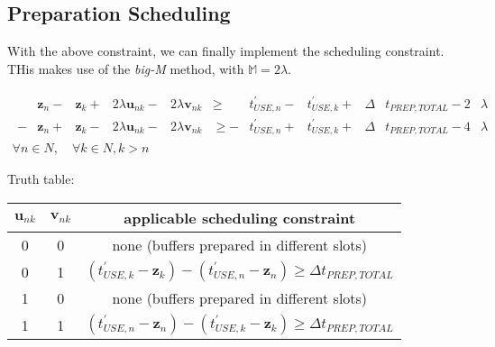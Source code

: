 \subsection{Preparation Scheduling}\label{SS.constr9}

With the above constraint, we can finally implement the scheduling constraint.
THis makes use of the \emph{big-M} method, with $\mathbb{M} = 2 \lambda$.

\begin{equation}
    \begin{split}
        \begin{alignedat}{10}
        &\boldsymbol{z}_{n} {}-{} &\boldsymbol{z}_{k} {}+{} &2 \lambda
        \boldsymbol{u}_{nk} {}-{} &2 \lambda \boldsymbol{v}_{nk} &\ge
        &t_{USE,n}^{\prime} {}-{} &t_{USE,k}^{\prime} {}+{}
        &\Delta &t_{PREP,TOTAL} {}-{} 2 &\lambda\\
        - &\boldsymbol{z}_{n} {}+{} &\boldsymbol{z}_{k} {}-{} &2 \lambda
        \boldsymbol{u}_{nk} {}-{} &2 \lambda \boldsymbol{v}_{nk} &\ge
        - &t_{USE,n}^{\prime} {}+{} &t_{USE,k}^{\prime} {}+{}
        &\Delta &t_{PREP,TOTAL} {}-{} 4 &\lambda
        \end{alignedat}
        \\\forall n \in N, \quad \forall k \in N, k > n
    \end{split}
    \label{eq.constr9}
\end{equation}

Truth table:

\begin{center}
    \begin{tabular}{c c | c}
        $\boldsymbol{u}_{nk}$ & $\boldsymbol{v}_{nk}$ 
        & applicable scheduling constraint\\ \hline
        0 & 0 & none (buffers prepared in different slots)\\
        0 & 1 & $\left( t_{USE,k}^{\prime} - \boldsymbol{z}_{k} \right)
            - \left( t_{USE,n}^{\prime} - \boldsymbol{z}_{n} \right)
            \ge \Delta t_{PREP,TOTAL}$\\
        1 & 0 & none (buffers prepared in different slots)  \\
        1 & 1 & $\left( t_{USE,n}^{\prime} - \boldsymbol{z}_{n} \right)
            - \left( t_{USE,k}^{\prime} - \boldsymbol{z}_{k} \right)
            \ge \Delta t_{PREP,TOTAL}$\\
    \end{tabular}
\end{center}

